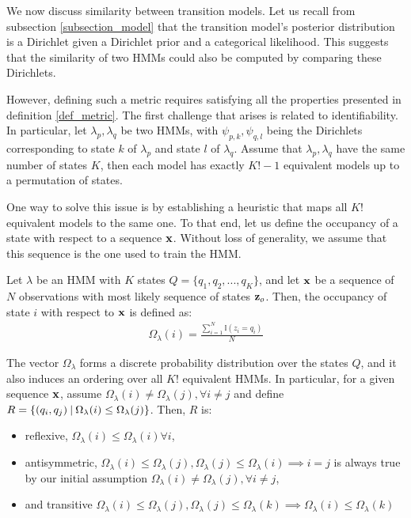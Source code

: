 \documentclass[../main.tex]{subfiles}
\begin{document}
\par We now discuss similarity between transition models. Let us recall from subsection \ref{subsection_model} that the transition model's posterior distribution is a Dirichlet given a Dirichlet prior and a categorical likelihood. This suggests that the similarity of two HMMs could also be computed by comparing these Dirichlets.
\par However, defining such a metric requires satisfying all the properties presented in definition \ref{def_metric}. The first challenge that arises is related to identifiability. In particular, let $\lambda_p, \lambda_q$ be two HMMs, with $\psi_{p, k}, \psi_{q, l}$ being the Dirichlets corresponding to state $k$ of $\lambda_p$ and state $l$ of $\lambda_q$. Assume that $\lambda_p, \lambda_q$ have the same number of states $K$, then each model has exactly $K!-1$ equivalent models up to a permutation of states. \par One way to solve this issue is by establishing a heuristic that maps all $K!$ equivalent models to the same one. To that end, let us define the occupancy of a state with respect to a sequence $\mathbf{x}$. Without loss of generality, we assume that this sequence is the one used to train the HMM.
\begin{definition}\label{def_occupancy}
Let $\lambda$ be an HMM with $K$ states $Q = \{q_1, q_2, ..., q_K\}$, and let $\mathbf{x}$ be a sequence of $N$ observations with most likely sequence of states $\mathbf{z}_o$. Then, the occupancy of state $i$ with respect to $\mathbf{x}$ is defined as:
\begin{align*}
\Omega_\lambda(i) = \frac{\sum_{i=1}^N\mathbb{I}(z_{i} = q_i)}{N}
\end{align*}
\end{definition}
\par The vector $\Omega_\lambda$ forms a discrete probability distribution over the states $Q$, and it also induces an ordering over all $K!$ equivalent HMMs. In particular, for a given sequence $\mathbf{x}$, assume $\Omega_\lambda(i) \neq \Omega_\lambda(j), \forall i\neq j$ and define $R = \{(q_i, q_j) \:\vert\: \Omega_\lambda(i) \leq \Omega_\lambda(j)\}$. Then, $R$ is:
\begin{itemize}
\item reflexive, $\Omega_\lambda(i) \leq \Omega_\lambda(i) \forall i$,
\item antisymmetric, $\Omega_\lambda(i) \leq \Omega_\lambda(j), \Omega_\lambda(j) \leq \Omega_\lambda(i) \implies i = j$ is always true by our initial assumption $\Omega_\lambda(i) \neq \Omega_\lambda(j), \forall i\neq j$,
\item and transitive $\Omega_\lambda(i) \leq \Omega_\lambda(j), \Omega_\lambda(j) \leq \Omega_\lambda(k) \implies \Omega_\lambda(i) \leq \Omega_\lambda(k)$
\end{itemize}
\end{document}

